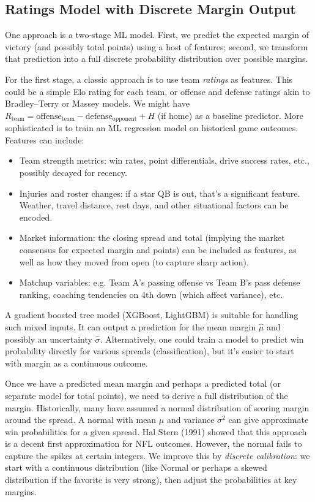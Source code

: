 \documentclass[11pt]{amsart}
\begin{document}
\subsection{Ratings Model with Discrete Margin Output}
One approach is a two-stage ML model. First, we predict the expected margin of victory (and possibly total points) using a host of features; second, we transform that prediction into a full discrete probability distribution over possible margins.

For the first stage, a classic approach is to use team \textit{ratings} as features. This could be a simple Elo rating for each team, or offense and defense ratings akin to Bradley–Terry or Massey models. We might have $R_{\text{team}} = \text{offense}_{\text{team}} - \text{defense}_{\text{opponent}} + H$ (if home) as a baseline predictor. More sophisticated is to train an ML regression model on historical game outcomes. Features can include:
\begin{itemize}
    \item Team strength metrics: win rates, point differentials, drive success rates, etc., possibly decayed for recency.
    \item Injuries and roster changes: if a star QB is out, that’s a significant feature. Weather, travel distance, rest days, and other situational factors can be encoded.
    \item Market information: the closing spread and total (implying the market consensus for expected margin and points) can be included as features, as well as how they moved from open (to capture sharp action).
    \item Matchup variables: e.g. Team A’s passing offense vs Team B’s pass defense ranking, coaching tendencies on 4th down (which affect variance), etc.
\end{itemize}
A gradient boosted tree model (XGBoost, LightGBM) is suitable for handling such mixed inputs. It can output a prediction for the mean margin $\hat{\mu}$ and possibly an uncertainty $\hat{\sigma}$. Alternatively, one could train a model to predict win probability directly for various spreads (classification), but it’s easier to start with margin as a continuous outcome.

Once we have a predicted mean margin and perhaps a predicted total (or separate model for total points), we need to derive a full distribution of the margin. Historically, many have assumed a normal distribution of scoring margin around the spread. A normal with mean $\mu$ and variance $\sigma^2$ can give approximate win probabilities for a given spread. Hal Stern (1991) showed that this approach is a decent first approximation for NFL outcomes. However, the normal fails to capture the spikes at certain integers. We improve this by \textit{discrete calibration}: we start with a continuous distribution (like Normal or perhaps a skewed distribution if the favorite is very strong), then adjust the probabilities at key margins.
\end{document}
